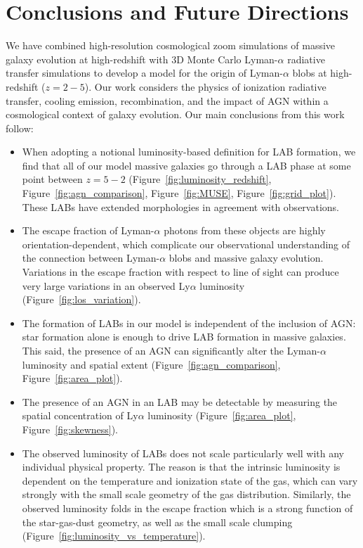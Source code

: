 \chapter{Conclusions and Future Directions}
\label{sec:discussion}
\label{sec:conclusions}

We have combined high-resolution cosmological zoom simulations of massive galaxy evolution at high-redshift with $3$D Monte Carlo Lyman-$\alpha$ radiative transfer simulations to develop a model for the origin of Lyman-$\alpha$ blobs at high-redshift ($z=2-5$).
Our work considers the physics of ionization radiative transfer, cooling emission, recombination, and the impact of AGN within a cosmological context of galaxy evolution.
Our main conclusions from this work follow:
\begin{itemize}

    \item When adopting a notional luminosity-based definition for LAB formation, we find that all of our model massive galaxies go through a LAB phase at some point between $z=5-2$ (Figure~\ref{fig:luminosity_redshift}, Figure~\ref{fig:agn_comparison}, Figure~\ref{fig:MUSE}, Figure~\ref{fig:grid_plot}).  These LABs have extended morphologies in agreement with observations.

    \item The escape fraction of Lyman-$\alpha$ photons from these objects are highly orientation-dependent, which complicate our observational understanding of the connection between Lyman-$\alpha$ blobs and massive galaxy evolution. Variations in the escape fraction with respect to line of sight can produce very large variations in an observed Ly$\alpha$ luminosity (Figure~\ref{fig:los_variation}).
    
    \item The formation of LABs in our model is independent of the inclusion of AGN: star formation alone is enough to drive LAB formation in massive galaxies. This said, the presence of an AGN can significantly alter the Lyman-$\alpha$ luminosity and spatial extent (Figure~\ref{fig:agn_comparison}, Figure~\ref{fig:area_plot}).
    
    \item The presence of an AGN in an LAB may be detectable by measuring the spatial concentration of Ly$\alpha$ luminosity (Figure~\ref{fig:area_plot}, Figure~\ref{fig:skewness}).
    
    \item The observed luminosity of LABs does not scale particularly well with any individual physical property.  The reason is that the intrinsic luminosity is dependent on the temperature and ionization state of the gas, which can vary strongly with the small scale geometry of the gas distribution.  Similarly, the observed luminosity folds in the escape fraction which is a strong function of the star-gas-dust geometry, as well as the small scale clumping  (Figure~\ref{fig:luminosity_vs_temperature}).
    
\end{itemize}


